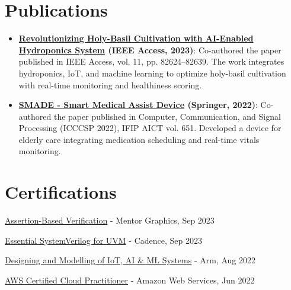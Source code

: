 \documentclass[a4paper,20pt]{article}
\newcommand{\resumeItem}[2]{
  \item\small{
    \textbf{#1}{: #2 \vspace{-2pt}}
  }
}
\newcommand{\resumeSubItem}[2]{\resumeItem{#1}{#2}\vspace{-3pt}}
\newcommand{\resumeSubHeadingListStart}{\begin{itemize}[leftmargin=*]}
\newcommand{\resumeSubHeadingListEnd}{\end{itemize}}
\begin{document}
\section{Publications}
\resumeSubHeadingListStart
\resumeSubItem{\href{https://ieeexplore.ieee.org/document/10198435}{Revolutionizing Holy-Basil Cultivation with AI-Enabled Hydroponics System} (IEEE Access, 2023)}{Co-authored the paper published in IEEE Access, vol. 11, pp. 82624–82639. The work integrates hydroponics, IoT, and machine learning to optimize holy-basil cultivation with real-time monitoring and healthiness scoring.}
\vspace{2pt}
\resumeSubItem{\href{https://doi.org/10.1007/978-3-031-11633-9_19}{SMADE - Smart Medical Assist Device} (Springer, 2022)}{Co-authored the paper published in Computer, Communication, and Signal Processing (ICCCSP 2022), IFIP AICT vol. 651. Developed a device for elderly care integrating medication scheduling and real-time vitals monitoring.}
\resumeSubHeadingListEnd
\vspace{-5pt}
\section{Certifications}
\begin{description}[font=$\bullet$]
\item {\href{https://verificationacademy.com/courses/assertion-based-verification}{Assertion-Based Verification} - Mentor Graphics, Sep 2023}
\vspace{-5pt}
\item {\href{https://www.linkedin.com/in/souranild/details/certifications/1635541591437/single-media-viewer}{Essential SystemVerilog for UVM} - Cadence, Sep 2023}
\vspace{-5pt}
\item {\href{https://www.credential.net/6c3989e0-fd5c-456a-b3a6-d2a782bca74f}{Designing and Modelling of IoT, AI \& ML Systems} - Arm, Aug 2022}
\vspace{-5pt}
\item {\href{https://www.credly.com/badges/dba3eefa-3ac0-44e8-849f-2ccfcf4cf768/public_url}{AWS Certified Cloud Practitioner} - Amazon Web Services, Jun 2022}
\end{description}
\end{document}
